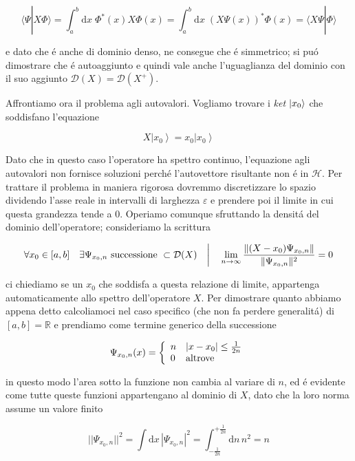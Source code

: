 \begin{enumerate}
$$\langle\Psi|X\Phi\rangle=\int_{a}^{b}\mathrm{d}x\;\Phi^{*}(x)X\Phi(x)=\int_{a}^{b}\mathrm{d}x\;(X\Psi(x))^{*}\Phi(x)=\langle X\Psi|\Phi\rangle$$  

e dato che \'e anche di dominio denso, ne consegue che \'e simmetrico; si pu\'o dimostrare che \'e autoaggiunto e quindi vale anche l'uguaglianza del dominio con il suo aggiunto $\mathcal{D}(X) = \mathcal{D}(X^+)$.

Affrontiamo ora il problema agli autovalori. Vogliamo trovare i \textit{ket} $\normalsize| x_0 \normalsize\rangle$ che soddisfano l'equazione

$$X\left|x_{0}\right\rangle=x_{0}\left|x_{0}\right\rangle$$

Dato che in questo caso l'operatore ha spettro continuo, l'equazione agli autovalori non fornisce soluzioni perch\'e l'autovettore risultante non \'e in $\mathcal{H}$. Per trattare il problema in maniera rigorosa dovremmo discretizzare lo spazio dividendo l'asse reale in intervalli di larghezza $\varepsilon$ e prendere poi il limite in cui questa grandezza tende a 0.
Operiamo comunque sfruttando la densit\'a del dominio dell'operatore; consideriamo la scrittura

\begin{equation}
	\label{eq:oper X}
	\forall x_{0}\in[a,b]\quad\exists\Psi_{x_{0},n}\text{ successione }\subset\mathcal{D}(X)\quad\bigg{|}\quad\lim_{n\to\infty}\frac{\|(X-x_{0})\Psi_{x_{0},n}\|}{\|\Psi_{x_{0},n}\|^{2}}=0
\end{equation} 

ci chiediamo se un $x_{0}$ che soddisfa a questa relazione di limite, appartenga automaticamente allo spettro dell'operatore $X$. Per dimostrare quanto abbiamo appena detto calcoliamoci nel caso specifico (che non fa perdere generalit\'a) di $[a, b] = \mathbb{R}$ e prendiamo come termine generico della successione
	
$$\Psi_{x_{0},n}(x)={\left\{\begin{array}{l l}{n}&{|x-x_{0}|\leq{\frac{1}{2n}}}\\ {0}&{\text{altrove}}\end{array}\right.}$$

in questo modo l'area sotto la funzione non cambia al variare di $n$, ed \'e evidente come tutte queste funzioni appartengano al dominio di $X$, dato che la loro norma assume un valore finito

$$||\Psi_{x_{0},n}||^{2}=\int\mathrm{d}x\,|\Psi_{x_{0},n}|^{2}=\int_{-\frac{1}{2n}}^{+\frac{1}{2n}}\mathrm{d}n\,n^{2}=n$$


\end{enumerate}

